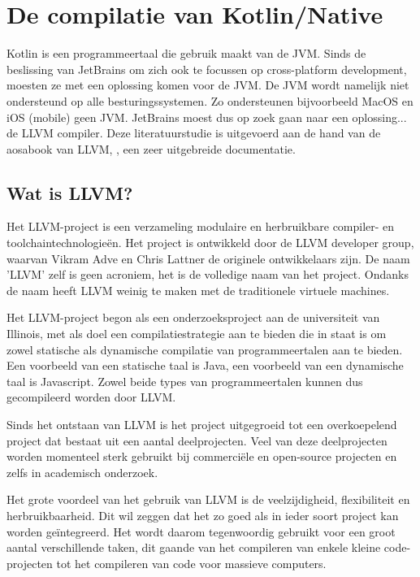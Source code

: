 
\chapter{De compilatie van Kotlin/Native}
\label{ch:compiler}
Kotlin is een programmeertaal die gebruik maakt van de JVM. Sinds de beslissing van JetBrains om zich ook te focussen op cross-platform development, moesten ze met een oplossing komen voor de JVM. De JVM wordt namelijk niet ondersteund op alle besturingssystemen. Zo ondersteunen bijvoorbeeld MacOS en iOS (mobile) geen JVM. JetBrains moest dus op zoek gaan naar een oplossing... de LLVM compiler. Deze literatuurstudie is uitgevoerd aan de hand van de aosabook van LLVM, \textcite{aosa}, een zeer uitgebreide documentatie. 

\section{Wat is LLVM?}
Het LLVM-project is een verzameling modulaire en herbruikbare compiler- en toolchaintechnologieën. Het project is ontwikkeld door de LLVM developer group, waarvan Vikram Adve en Chris Lattner de originele ontwikkelaars zijn. De naam 'LLVM' zelf is geen acroniem, het is de volledige naam van het project. Ondanks de naam heeft LLVM weinig te maken met de traditionele virtuele machines.

Het LLVM-project begon als een onderzoeksproject aan de universiteit van Illinois, met als doel een compilatiestrategie aan te bieden die in staat is om zowel statische als dynamische compilatie van programmeertalen aan te bieden. Een voorbeeld van een statische taal is Java, een voorbeeld van een dynamische taal is Javascript. Zowel beide types van programmeertalen kunnen dus gecompileerd worden door LLVM.

Sinds het ontstaan van LLVM is het project uitgegroeid tot een overkoepelend project dat bestaat uit een aantal deelprojecten. Veel van deze deelprojecten worden momenteel sterk gebruikt bij commerciële en open-source projecten en zelfs in academisch onderzoek.

Het grote voordeel van het gebruik van LLVM is de veelzijdigheid, flexibiliteit en herbruikbaarheid. Dit wil zeggen dat het zo goed als in ieder soort project kan worden geïntegreerd. Het wordt daarom tegenwoordig gebruikt voor een groot aantal verschillende taken, dit gaande van het compileren van enkele kleine code-projecten tot het compileren van code voor massieve computers.

